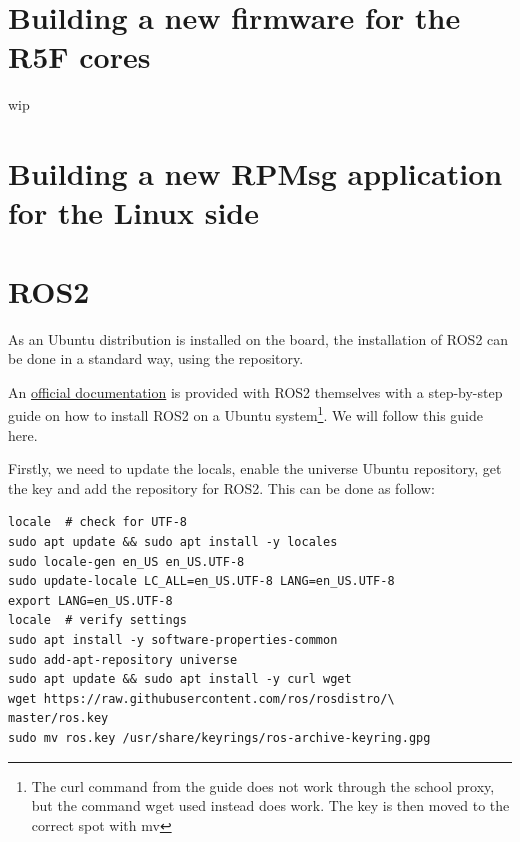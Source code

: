 \documentclass[10pt]{article}
\begin{document}
\section{Building a new firmware for the R5F cores}
\label{sec:build-new-firmw}
wip

\section{Building a new RPMsg application for the Linux side}
\label{sec:building-new-rpmsg}






\section{ROS2}
\label{sec:ros2}
As an Ubuntu distribution is installed on the board, the installation of ROS2 can be done
in a standard way, using the repository.

An \href{https://docs.ros.org/en/humble/Installation/Ubuntu-Install-Debians.html}{official documentation}
is provided with ROS2 themselves with a step-by-step guide on how to install
ROS2 on a Ubuntu system\footnote{The curl command from the guide does not work through the school proxy,
  but the command wget used instead does work. The key is then moved to the correct spot with mv}.
We will follow this guide here.

Firstly, we need to update the locals,  enable the universe Ubuntu repository, get the key and add the repository for ROS2. This can be done as follow:

\begin{tcolorbox}
\begin{verbatim}
locale  # check for UTF-8
sudo apt update && sudo apt install -y locales
sudo locale-gen en_US en_US.UTF-8
sudo update-locale LC_ALL=en_US.UTF-8 LANG=en_US.UTF-8
export LANG=en_US.UTF-8
locale  # verify settings
sudo apt install -y software-properties-common
sudo add-apt-repository universe
sudo apt update && sudo apt install -y curl wget
wget https://raw.githubusercontent.com/ros/rosdistro/\
master/ros.key
sudo mv ros.key /usr/share/keyrings/ros-archive-keyring.gpg
\end{verbatim}
\end{tcolorbox}
\end{document}
